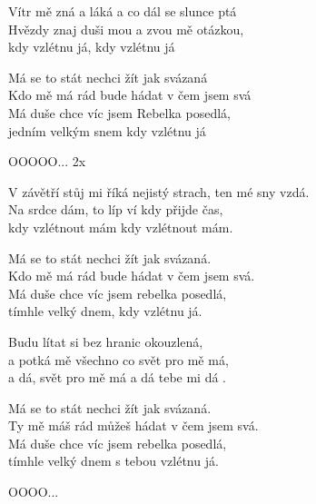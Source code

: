 
\ve{}
Vítr mě zná a láká a co dál se slunce ptá\\
Hvězdy  znaj duši mou a zvou mě otázkou,\\
kdy vzlétnu  já, kdy vzlétnu já

Má se to stát nechci žít jak svázaná\\
Kdo mě má rád bude hádat v čem jsem svá\\
Má duše chce víc jsem Rebelka posedlá,\\
jedním velkým snem kdy vzlétnu já

\re{*:}
OOOOO...  2x

\ve{}
V závětří stůj mi říká nejistý strach, ten mé sny vzdá.\\
Na srdce dám, to líp ví kdy přijde čas,\\
kdy vzlétnout mám kdy vzlétnout mám.

Má se to stát nechci žít jak svázaná.\\
Kdo mě má rád bude hádat v čem jsem svá.\\
Má duše chce víc jsem rebelka posedlá,\\
tímhle velký dnem, kdy vzlétnu já.

\ve{}
Budu lítat si bez hranic okouzlená,\\
a potká mě všechno co svět pro mě má,\\
a dá,  svět pro mě má a dá tebe mi dá  .

Má se to stát nechci žít jak svázaná.\\
Ty mě máš rád můžeš hádat v čem jsem svá.\\
Má duše chce víc jsem rebelka posedlá,\\
tímhle velký dnem s tebou vzlétnu já.

\re{*:}
OOOO... 

\esong{}